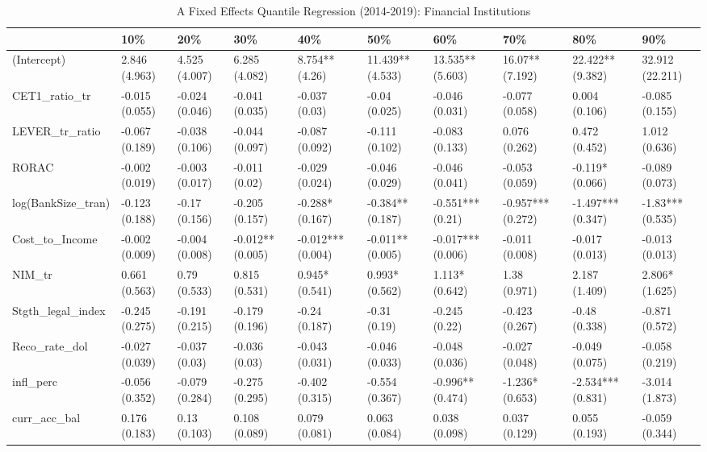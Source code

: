 \begin{table}[ht]
\centering
\caption{A Fixed Effects Quantile Regression (2014-2019): Financial Institutions} 
\begingroup\small
\begin{tabular}{llllllllll}
  \toprule
 & 10\% & 20\% & 30\% & 40\% & 50\% & 60\% & 70\% & 80\% & 90\% \\ 
  \midrule
(Intercept) & 2.846 (4.963) & 4.525 (4.007) & 6.285 (4.082) & 8.754** (4.26) & 11.439** (4.533) & 13.535** (5.603) & 16.07** (7.192) & 22.422** (9.382) & 32.912 (22.211) \\ 
  CET1\_ratio\_tr & -0.015 (0.055) & -0.024 (0.046) & -0.041 (0.035) & -0.037 (0.03) & -0.04 (0.025) & -0.046 (0.031) & -0.077 (0.058) & 0.004 (0.106) & -0.085 (0.155) \\ 
  LEVER\_tr\_ratio & -0.067 (0.189) & -0.038 (0.106) & -0.044 (0.097) & -0.087 (0.092) & -0.111 (0.102) & -0.083 (0.133) & 0.076 (0.262) & 0.472 (0.452) & 1.012 (0.636) \\ 
  RORAC & -0.002 (0.019) & -0.003 (0.017) & -0.011 (0.02) & -0.029 (0.024) & -0.046 (0.029) & -0.046 (0.041) & -0.053 (0.059) & -0.119* (0.066) & -0.089 (0.073) \\ 
  log(BankSize\_tran) & -0.123 (0.188) & -0.17 (0.156) & -0.205 (0.157) & -0.288* (0.167) & -0.384** (0.187) & -0.551*** (0.21) & -0.957*** (0.272) & -1.497*** (0.347) & -1.83*** (0.535) \\ 
  Cost\_to\_Income & -0.002 (0.009) & -0.004 (0.008) & -0.012** (0.005) & -0.012*** (0.004) & -0.011** (0.005) & -0.017*** (0.006) & -0.011 (0.008) & -0.017 (0.013) & -0.013 (0.013) \\ 
  NIM\_tr & 0.661 (0.563) & 0.79 (0.533) & 0.815 (0.531) & 0.945* (0.541) & 0.993* (0.562) & 1.113* (0.642) & 1.38 (0.971) & 2.187 (1.409) & 2.806* (1.625) \\ 
  Stgth\_legal\_index & -0.245 (0.275) & -0.191 (0.215) & -0.179 (0.196) & -0.24 (0.187) & -0.31 (0.19) & -0.245 (0.22) & -0.423 (0.267) & -0.48 (0.338) & -0.871 (0.572) \\ 
  Reco\_rate\_dol & -0.027 (0.039) & -0.037 (0.03) & -0.036 (0.03) & -0.043 (0.031) & -0.046 (0.033) & -0.048 (0.036) & -0.027 (0.048) & -0.049 (0.075) & -0.058 (0.219) \\ 
  infl\_perc & -0.056 (0.352) & -0.079 (0.284) & -0.275 (0.295) & -0.402 (0.315) & -0.554 (0.367) & -0.996** (0.474) & -1.236* (0.653) & -2.534*** (0.831) & -3.014 (1.873) \\ 
  curr\_acc\_bal & 0.176 (0.183) & 0.13 (0.103) & 0.108 (0.089) & 0.079 (0.081) & 0.063 (0.084) & 0.038 (0.098) & 0.037 (0.129) & 0.055 (0.193) & -0.059 (0.344) \\ 

\end{tabular}
\end{table}
